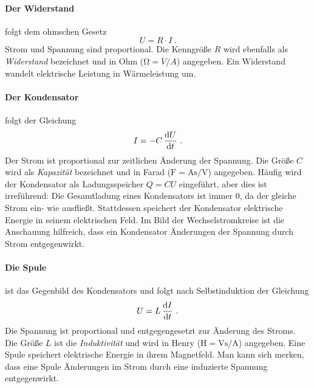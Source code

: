 \paragraph*{Der Widerstand} folgt dem ohmschen Gesetz
\begin{equation}\label{eq:R}
    U = R\cdot I ~.
\end{equation}
Strom und Spannung sind proportional. Die Kenngröße $R$ wird ebenfalls als \emph{Widerstand} bezeichnet und in Ohm ($\si{\ohm} = \si{V}/\si{A}$) angegeben. Ein Widerstand wandelt elektrische Leistung in Wärmeleistung um.
\paragraph*{Der Kondensator}
folgt der Gleichung
\begin{equation}\label{eq:C}
    I = - C\,\dv{U}{t} ~.
\end{equation}
Der Strom ist proportional zur zeitlichen Änderung der Spannung. Die Größe $C$ wird als \emph{Kapazität} bezeichnet und in Farad ($\si{\farad} = \si{\ampere\second}/\si{\volt}$) angegeben. Häufig wird der Kondensator als Ladungsspeicher $Q = CU$ eingeführt, aber dies ist irreführend: Die Gesamtladung eines Kondensators ist immer 0, da der gleiche Strom ein- wie ausfließt. Stattdessen speichert der Kondensator elektrische Energie in seinem elektrischen Feld. Im Bild der Wechselstromkreise ist die Anschauung hilfreich, dass ein Kondensator Änderungen der Spannung durch Strom entgegenwirkt.
\paragraph*{Die Spule}
ist das Gegenbild des Kondensators und folgt nach Selbstinduktion der Gleichung
\begin{equation}\label{eq:L}
    U = L\,\dv{I}{t} ~.
\end{equation}
Die Spannung ist proportional und entgegengesetzt zur Änderung des Stroms. Die Größe $L$ ist die \emph{Induktivität} und wird in Henry ($\si{\henry} = \si{\volt\second}/\si{\ampere}$) angegeben. Eine Spule speichert elektrische Energie in ihrem Magnetfeld. Man kann sich merken, dass eine Spule Änderungen im Strom durch eine induzierte Spannung entgegenwirkt.
